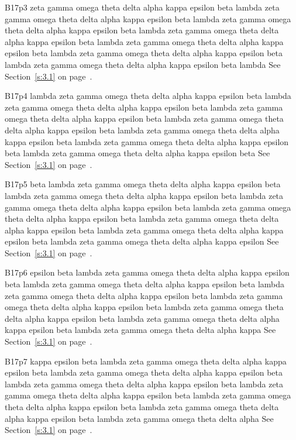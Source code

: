 B17p3 zeta gamma omega theta delta alpha kappa epsilon beta lambda zeta gamma omega theta delta alpha kappa epsilon beta lambda zeta gamma omega theta delta alpha kappa epsilon beta lambda zeta gamma omega theta delta alpha kappa epsilon beta lambda zeta gamma omega theta delta alpha kappa epsilon beta lambda zeta gamma omega theta delta alpha kappa epsilon beta lambda zeta gamma omega theta delta alpha kappa epsilon beta lambda See Section~\ref{s:3.1} on page~\pageref{s:3.1}.

B17p4 lambda zeta gamma omega theta delta alpha kappa epsilon beta lambda zeta gamma omega theta delta alpha kappa epsilon beta lambda zeta gamma omega theta delta alpha kappa epsilon beta lambda zeta gamma omega theta delta alpha kappa epsilon beta lambda zeta gamma omega theta delta alpha kappa epsilon beta lambda zeta gamma omega theta delta alpha kappa epsilon beta lambda zeta gamma omega theta delta alpha kappa epsilon beta See Section~\ref{s:3.1} on page~\pageref{s:3.1}.

B17p5 beta lambda zeta gamma omega theta delta alpha kappa epsilon beta lambda zeta gamma omega theta delta alpha kappa epsilon beta lambda zeta gamma omega theta delta alpha kappa epsilon beta lambda zeta gamma omega theta delta alpha kappa epsilon beta lambda zeta gamma omega theta delta alpha kappa epsilon beta lambda zeta gamma omega theta delta alpha kappa epsilon beta lambda zeta gamma omega theta delta alpha kappa epsilon See Section~\ref{s:3.1} on page~\pageref{s:3.1}.

B17p6 epsilon beta lambda zeta gamma omega theta delta alpha kappa epsilon beta lambda zeta gamma omega theta delta alpha kappa epsilon beta lambda zeta gamma omega theta delta alpha kappa epsilon beta lambda zeta gamma omega theta delta alpha kappa epsilon beta lambda zeta gamma omega theta delta alpha kappa epsilon beta lambda zeta gamma omega theta delta alpha kappa epsilon beta lambda zeta gamma omega theta delta alpha kappa See Section~\ref{s:3.1} on page~\pageref{s:3.1}.

B17p7 kappa epsilon beta lambda zeta gamma omega theta delta alpha kappa epsilon beta lambda zeta gamma omega theta delta alpha kappa epsilon beta lambda zeta gamma omega theta delta alpha kappa epsilon beta lambda zeta gamma omega theta delta alpha kappa epsilon beta lambda zeta gamma omega theta delta alpha kappa epsilon beta lambda zeta gamma omega theta delta alpha kappa epsilon beta lambda zeta gamma omega theta delta alpha See Section~\ref{s:3.1} on page~\pageref{s:3.1}.

